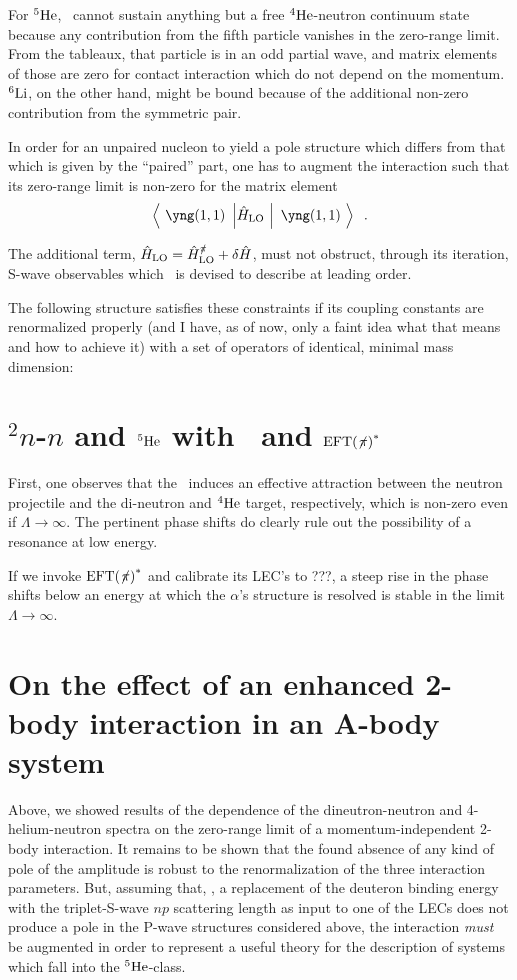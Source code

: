 \documentclass[aps,prd,twocolumn
,tightenlines,letterpaper,
nofootinbib]{revtex4-1}
\begin{document}
For ${{}^5\text{He}}$, \eftnopi~cannot sustain anything but a free ${{}^4\text{He}}$-neutron
continuum state because any contribution from the fifth particle vanishes
in the zero-range limit. From the tableaux, that particle is in an odd partial
wave, and matrix elements of those are zero for contact interaction which do
not depend on the momentum. ${{}^6\text{Li}}$, on the other hand, might be bound because
of the additional non-zero contribution from the symmetric pair.

In order for an unpaired nucleon to yield a pole structure which differs from
that which is given by the ``paired'' part, one has to augment the interaction
such that its zero-range limit is non-zero for the matrix element
$$\left\langle~\yng(1,1)~\left\vert\hat{H}_\text{LO}~\right\vert~\yng(1,1)~\right\rangle\;\;.$$

The additional term, $\hat{H}_\text{LO}=\hat{H}^{\slashed{\pi}}_\text{LO}+\delta\hat{H}$,
must not obstruct, through its iteration, S-wave observables which \eftnopi~is
devised to describe at leading order.

The following structure satisfies these constraints if its coupling constants
are renormalized properly (and I have, as of now, only a faint idea what that
means and how to achieve it) with a set of operators of identical, minimal mass
dimension:

\section{${}^2n$-$n$ and ${{}^5\text{He}}$ with \eftnopi~and $\mbox{EFT$(\not \! \pi)$}^*$}
First, one observes that the \eftnopi~induces an effective attraction between the neutron projectile
and the di-neutron and ${{}^4\text{He}}$ target, respectively, which is non-zero even if $\Lambda\to\infty$.
The pertinent phase shifts do clearly rule out the possibility of a resonance at low energy.

If we invoke $\mbox{EFT$(\not \! \pi)$}^*$ and calibrate its LEC's to ???, a steep rise in the phase shifts below
an energy at which the $\alpha$'s structure is resolved is stable in the limit $\Lambda\to\infty$.

\section{On the effect of an enhanced 2-body interaction in an A-body system}

Above, we showed results of the dependence of the dineutron-neutron and
4-helium-neutron spectra on the zero-range limit of a momentum-independent
2-body interaction. It remains to be shown that the found absence of any kind
of pole of the amplitude is robust \wrt to the renormalization of the three
interaction parameters. But, assuming that, \eg, a replacement of the deuteron
binding energy with the triplet-S-wave $np$ scattering length as input to
one of the LECs does not produce a pole in the P-wave structures considered
above, the interaction {\it must} be augmented in order to represent a useful
theory for the description of systems which fall into the ${{}^5\text{He}}$-class.
\end{document}

